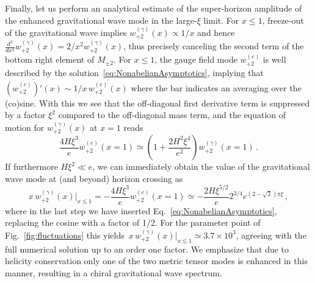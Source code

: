 {Finally, let us perform an analytical estimate of the super-horizon amplitude of the enhanced gravitational wave mode in the large-$\xi$ limit. For $x \leq 1$, freeze-out of the gravitational wave implies $w_{+2}^{(\gamma)}(x) \propto 1/x$ and hence $\tfrac{d^2}{dx^2} w_{+2}^{(\gamma)}(x) = 2/x^2 w_{+2}^{(\gamma)}(x)$, thus precisely canceling the second term of the bottom right element of $M_{\pm2}$. For $x \leq 1$, the gauge field mode $w_{+2}^{(e)}$ is well described by the solution~\eqref{eq:NonabelianAsymptotics}, implying that $\overline{(w_{+2}^{(e)})'(x)} \sim 1/x \, \overline{w_{+2}^{(e)}(x)}$ where the bar indicates an averaging over the (co)sine. With this we see that the off-diagonal first derivative term is suppressed by a factor $\xi^2$ compared to the off-diagonal mass term, and the equation of motion for $w_{+2}^{(\gamma)}(x)$ at $x = 1$ reads
\begin{equation}
   \frac{4 H \xi^3}{e }  w_{+2}^{(e)}(x = 1) \simeq \left(1  + \frac{2 H^2 \xi^4}{ e^2}  \right) w_{+2}^{(\gamma)}(x = 1) \,.
\end{equation}
If furthermore $H \xi^2 \ll e$, we can immediately obtain the value of the gravitational wave mode at (and beyond) horizon crossing as
\begin{equation}
 x \, w_{+2}^{(\gamma)}(x) \big|_{x \lesssim 1} = -  \frac{4 H \xi^{3}}{e } w_{+2}^{(e)}(x = 1) \simeq -  \frac{2 H \xi^{5/2}}{e }  2^{3/4} e^{(2 - \sqrt{2}) \pi \xi} \,,
 \label{eq:GWanalytical}
\end{equation}
where in the last step we have inserted Eq.~\eqref{eq:NonabelianAsymptotics}, replacing the cosine with a factor of 1/2. For the parameter point of Fig.~\ref{fig:fluctuations} this yields $ \, x \, w_{+2}^{(\gamma)}(x) \big|_{x \lesssim 1} \simeq 3.7 \times 10^3$, agreeing with the full numerical solution up to an order one factor.} We emphasize that due to helicity conservation only one of the two metric tensor modes is enhanced in this manner, resulting in a chiral gravitational wave spectrum. 



